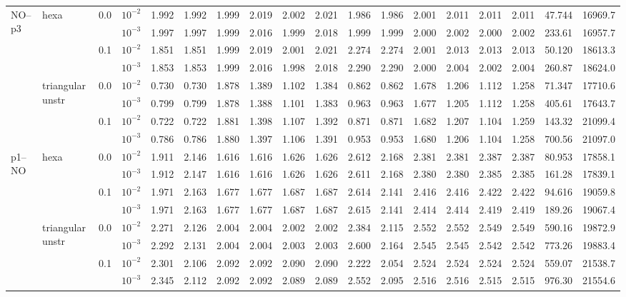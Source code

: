\begin{longtable}{llclrrrrrrrrrrrrrr}
\multirow{8}{*}{NO--p3} & \multirow{4}{*}{hexa} & \multirow{2}{*}{0.0} & $10^{-2}$ & 1.992 & 1.992 & 1.999 & 2.019 & 2.002 & 2.021 & 1.986 & 1.986 & 2.001 & 2.011 & 2.011 & 2.011 & 47.744 & 16969.7 \\
& & & $10^{-3}$ & 1.997 & 1.997 & 1.999 & 2.016 & 1.999 & 2.018 & 1.999 & 1.999 & 2.000 & 2.002 & 2.000 & 2.002 & 233.61 & 16957.7 \\\cline{3-18}
& & \multirow{2}{*}{0.1} & $10^{-2}$ & 1.851 & 1.851 & 1.999 & 2.019 & 2.001 & 2.021 & 2.274 & 2.274 & 2.001 & 2.013 & 2.013 & 2.013 & 50.120 & 18613.3 \\
& & & $10^{-3}$ & 1.853 & 1.853 & 1.999 & 2.016 & 1.998 & 2.018 & 2.290 & 2.290 & 2.000 & 2.004 & 2.002 & 2.004 & 260.87 & 18624.0 \\\cline{2-18}
& \multirow{4}{*}{triangular unstr} & \multirow{2}{*}{0.0} & $10^{-2}$ & 0.730 & 0.730 & 1.878 & 1.389 & 1.102 & 1.384 & 0.862 & 0.862 & 1.678 & 1.206 & 1.112 & 1.258 & 71.347 & 17710.6 \\
& & & $10^{-3}$ & 0.799 & 0.799 & 1.878 & 1.388 & 1.101 & 1.383 & 0.963 & 0.963 & 1.677 & 1.205 & 1.112 & 1.258 & 405.61 & 17643.7 \\\cline{3-18}
& & \multirow{2}{*}{0.1} & $10^{-2}$ & 0.722 & 0.722 & 1.881 & 1.398 & 1.107 & 1.392 & 0.871 & 0.871 & 1.682 & 1.207 & 1.104 & 1.259 & 143.32 & 21099.4 \\
& & & $10^{-3}$ & 0.786 & 0.786 & 1.880 & 1.397 & 1.106 & 1.391 & 0.953 & 0.953 & 1.680 & 1.206 & 1.104 & 1.258 & 700.56 & 21097.0 \\\hline

\multirow{8}{*}{p1--NO} & \multirow{4}{*}{hexa} & \multirow{2}{*}{0.0} & $10^{-2}$ & 1.911 & 2.146 & 1.616 & 1.616 & 1.626 & 1.626 & 2.612 & 2.168 & 2.381 & 2.381 & 2.387 & 2.387 & 80.953 & 17858.1 \\
& & & $10^{-3}$ & 1.912 & 2.147 & 1.616 & 1.616 & 1.626 & 1.626 & 2.611 & 2.168 & 2.380 & 2.380 & 2.385 & 2.385 & 161.28 & 17839.1 \\\cline{3-18}
& & \multirow{2}{*}{0.1} & $10^{-2}$ & 1.971 & 2.163 & 1.677 & 1.677 & 1.687 & 1.687 & 2.614 & 2.141 & 2.416 & 2.416 & 2.422 & 2.422 & 94.616 & 19059.8 \\
& & & $10^{-3}$ & 1.971 & 2.163 & 1.677 & 1.677 & 1.687 & 1.687 & 2.615 & 2.141 & 2.414 & 2.414 & 2.419 & 2.419 & 189.26 & 19067.4 \\\cline{2-18}
& \multirow{4}{*}{triangular unstr} & \multirow{2}{*}{0.0} & $10^{-2}$ & 2.271 & 2.126 & 2.004 & 2.004 & 2.002 & 2.002 & 2.384 & 2.115 & 2.552 & 2.552 & 2.549 & 2.549 & 590.16 & 19872.9 \\
& & & $10^{-3}$ & 2.292 & 2.131 & 2.004 & 2.004 & 2.003 & 2.003 & 2.600 & 2.164 & 2.545 & 2.545 & 2.542 & 2.542 & 773.26 & 19883.4 \\\cline{3-18}
& & \multirow{2}{*}{0.1} & $10^{-2}$ & 2.301 & 2.106 & 2.092 & 2.092 & 2.090 & 2.090 & 2.222 & 2.054 & 2.524 & 2.524 & 2.524 & 2.524 & 559.07 & 21538.7 \\
& & & $10^{-3}$ & 2.345 & 2.112 & 2.092 & 2.092 & 2.089 & 2.089 & 2.552 & 2.095 & 2.516 & 2.516 & 2.515 & 2.515 & 976.30 & 21554.6 \\\hline


\end{longtable}
